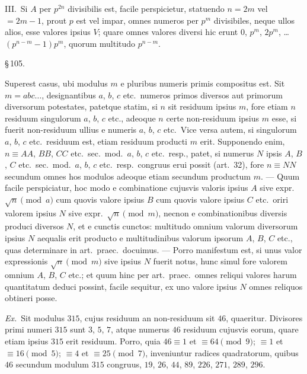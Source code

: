 \documentclass[12pt,a4paper]{article}
\theoremstyle{plain}
\theoremstyle{definition}
\theoremstyle{remark}
\begin{document}
III.\ Si $A$ per $p^{2n}$ divisibilis est, facile perspicietur, statuendo $n = 2m$ vel $= 2m - 1$, prout $p$ est vel impar, omnes numeros per $p^m$ divisibiles, neque ullos alios, esse valores ipsius $V$; quare omnes valores diversi hic erunt $0$, $p^m$, $2p^m$, \dots\ $(p^{n-m} - 1)p^m$, quorum multitudo $p^{n-m}$.

\begin{center}\S\,105.\end{center}

Superest casus, ubi modulus $m$ e pluribus numeris primis compositus est. Sit $m = abc\dots$, designantibus $a$, $b$, $c$ etc.\ numeros primos diversos aut primorum diversorum potestates, patetque statim, si $n$ sit residuum ipsius $m$, fore etiam $n$ residuum singulorum $a$, $b$, $c$ etc., adeoque $n$ certe non-residuum ipsius $m$ esse, si fuerit non-residuum ullius e numeris $a$, $b$, $c$ etc.\ Vice versa autem, si singulorum $a$, $b$, $c$ etc.\ residuum est, etiam residuum producti $m$ erit. Supponendo enim, $n \equiv AA$, $BB$, $CC$ etc.\ sec.\ mod.\ $a$, $b$, $c$ etc.\ resp., patet, si numerus $N$ ipsis $A$, $B$, $C$ etc.\ sec.\ mod.\ $a$, $b$, $c$ etc.\ resp.\ congruus erui possit (art.~32), fore $n \equiv NN$ secundum omnes hos modulos adeoque etiam secundum productum $m$. --- Quum facile perspiciatur, hoc modo e combinatione cujusvis valoris ipsius $A$ sive expr.\ $\sqrt{n} \pmod{a}$ cum quovis valore ipsius $B$ cum quovis valore ipsius $C$ etc.\ oriri valorem ipsius $N$ sive expr.\ $\sqrt{n} \pmod{m}$, necnon e combinationibus diversis produci diversos $N$, et e cunctis cunctos: multitudo omnium valorum diversorum ipsius $N$ aequalis erit producto e multitudinibus valorum ipsorum $A$, $B$, $C$ etc., quas determinare in art.\ praec.\ docuimus. --- Porro manifestum est, si unus valor expressionis $\sqrt{n} \pmod{m}$ sive ipsius $N$ fuerit notus, hunc simul fore valorem omnium $A$, $B$, $C$ etc.; et quum hinc per art.\ praec.\ omnes reliqui valores harum quantitatum deduci possint, facile sequitur, ex uno valore ipsius $N$ omnes reliquos obtineri posse.

\textit{Ex.}\ Sit modulus $315$, cujus residuum an non-residuum sit $46$, quaeritur. Divisores primi numeri $315$ sunt $3$, $5$, $7$, atque numerus $46$ residuum cujusvis eorum, quare etiam ipsius $315$ erit residuum. Porro, quia $46 \equiv 1$ et $\equiv 64 \pmod{9}$; $\equiv 1$ et $\equiv 16 \pmod{5}$; $\equiv 4$ et $\equiv 25 \pmod{7}$, inveniuntur radices quadratorum, quibus $46$ secundum modulum $315$ congruus, $19$, $26$, $44$, $89$, $226$, $271$, $289$, $296$.
\end{document}
